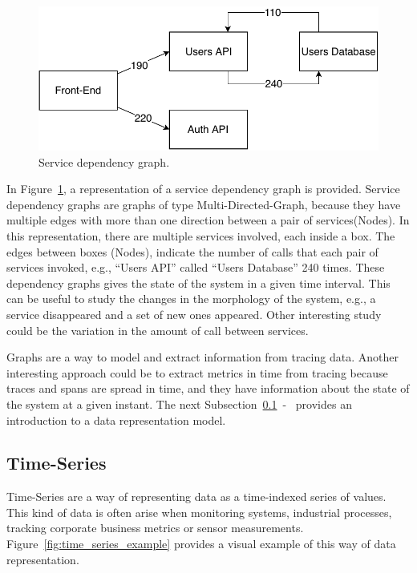 \begin{figure}[H]
    \centering
    \includegraphics[width=1.00\textwidth]{images/graph_service_representation.pdf}
    \caption{Service dependency graph.}
    \label{fig:service_dependency_graph}
\end{figure}

In Figure~\ref{fig:service_dependency_graph}, a representation of a service dependency graph is provided. Service dependency graphs are graphs of type Multi-Directed-Graph, because they have multiple edges with more than one direction between a pair of services(Nodes). In this representation, there are multiple services involved, each inside a box. The edges between boxes (Nodes), indicate the number of calls that each pair of services invoked, e.g., ``Users API'' called ``Users Database'' 240 times. These dependency graphs gives the state of the system in a given time interval. This can be useful to study the changes in the morphology of the system, e.g., a service disappeared and a set of new ones appeared. Other interesting study could be the variation in the amount of call between services.

Graphs are a way to model and extract information from tracing data. Another interesting approach could be to extract metrics in time from tracing because traces and spans are spread in time, and they have information about the state of the system at a given instant. The next Subsection~\ref{subsec:time_series}~-~ provides an introduction to a data representation model.

\subsection{Time-Series}
\label{subsec:time_series}

Time-Series are a way of representing data as a time-indexed series of values. This kind of data is often arise when monitoring systems, industrial processes, tracking corporate business metrics or sensor measurements. Figure~\ref{fig:time_series_example} provides a visual example of this way of data representation.

